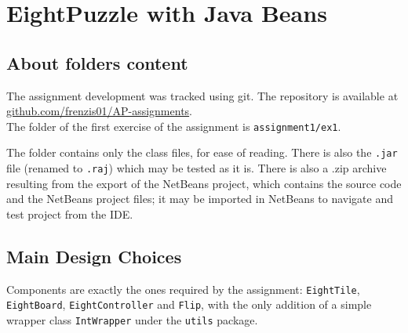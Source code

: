 \chapter{EightPuzzle with Java Beans}

\section{About folders content}

The assignment development was tracked using git. The repository is available at \href{https://github.com/frenzis01/AP-assignments}{github.com/frenzis01/AP-assignments}.\\
The folder of the first exercise of the assignment is \texttt{assignment1/ex1}.
 
The folder contains only the class files, for ease of reading.
There is also the \texttt{.jar} file (renamed to \texttt{.raj}) which may be tested as it is.
There is also a .zip archive resulting from the export of the NetBeans project, which contains the source code and the NetBeans project files; it may be imported in NetBeans to navigate and test project from the IDE.


\section{Main Design Choices}

Components are exactly the ones required by the assignment: \lstinline|EightTile|, \lstinline|EightBoard|, \lstinline|EightController| and \lstinline|Flip|, with the only addition of a simple wrapper class \lstinline|IntWrapper| under the \lstinline|utils| package.

